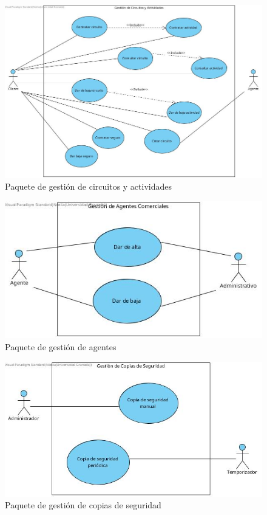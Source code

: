 \documentclass{article}
\begin{document}
	\begin{figure}[H]
		\centering
		\includegraphics[totalheight=7cm]{Gestion_de_Circuitos_y_Actividades}
		\caption{Paquete de gestión de circuitos y actividades}
		\label{fig:gestion_circuitos y actividades}
	\end{figure}

	\begin{figure}[H]
		\centering
		\includegraphics[totalheight=5cm]{GestionDeAgentes}
		\caption{Paquete de gestión de agentes}
		\label{fig:gestion_agentes}
	\end{figure}

	\begin{figure}[H]
		\centering
		\includegraphics[totalheight=5cm]{GestionDeCopiasDeSeguridad}
		\caption{Paquete de gestión de copias de seguridad}
		\label{fig:gestion_copias_seguridad}
	\end{figure}
\end{document}
